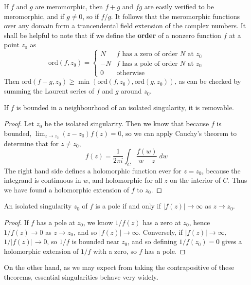 If $f$ and $g$ are meromorphic, then $f + g$ and $fg$ are easily verified to be meromorphic, and if $g \neq 0$, so if $f/g$. It follows that the meromorphic functions over any domain form a trancendental field extension of the complex numbers. It shall be helpful to note that if we define the {\bf order} of a nonzero function $f$ at a point $z_0$ as
%
\[ \text{ord}(f,z_0) = \begin{cases} N & \text{$f$ has a zero of order $N$ at $z_0$} \\ -N & \text{$f$ has a pole of order $N$ at $z_0$} \\ 0 & \text{otherwise} \end{cases} \]
%
Then $\text{ord}(f+g,z_0) \geq \min(\text{ord}(f,z_0), \text{ord}(g,z_0))$, as can be checked by summing the Laurent series of $f$ and $g$ around $z_0$.

\begin{theorem}[Riemann]
    If $f$ is bounded in a neighbourhood of an isolated singularity, it is removable.
\end{theorem}
\begin{proof}
    Let $z_0$ be the isolated singularity. Then we know that because $f$ is bounded, $\lim_{z \to z_0} (z - z_0) f(z) = 0$, so we can apply Cauchy's theorem to determine that for $z \neq z_0$,
    \[ f(z) = \frac{1}{2 \pi i} \int_C \frac{f(w)}{w - z}\; dw \]
    The right hand side defines a holomorphic function ever for $z = z_0$, because the integrand is continuous in $w$, and holomorphic for all $z$ on the interior of $C$. Thus we have found a holomorphic extension of $f$ to $z_0$.
\end{proof}

\begin{corollary}
    An isolated singularity $z_0$ of $f$ is a pole if and only if $|f(z)| \to \infty$ as $z \to z_0$.
\end{corollary}
\begin{proof}
    If $f$ has a pole at $z_0$, we know $1/f(z)$ has a zero at $z_0$, hence $1/f(z) \to 0$ as $z \to z_0$, and so $|f(z)| \to \infty$. Conversely, if $|f(z)| \to \infty$, $1/|f(z)| \to 0$, so $1/f$ is bounded near $z_0$, and so defining $1/f(z_0) = 0$ gives a holomorphic extension of $1/f$ with a zero, so $f$ has a pole.
\end{proof}

On the other hand, as we may expect from taking the contrapositive of these theorems, essential singularities behave very widely.

